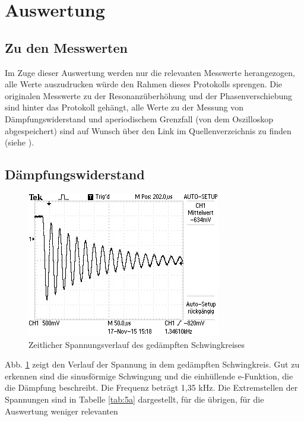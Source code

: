 \section{Auswertung}
\label{sec:Auswertung}
\subsection{Zu den Messwerten}
Im Zuge dieser Auswertung werden nur die relevanten Messwerte herangezogen,
alle Werte auszudrucken würde den Rahmen dieses Protokolls sprengen.
Die originalen Messwerte zu der Resonanzüberhöhung und der
Phasenverschiebung sind hinter das Protokoll
gehängt, alle Werte zu der Messung von Dämpfungswiderstand
und aperiodischem Grenzfall (von dem Oszilloskop abgespeichert)
sind auf Wunsch über den Link im Quellenverzeichnis zu finden
(siehe \cite{messwerte}).
\subsection{Dämpfungswiderstand}
\begin{figure}[H]
  \centering
  \includegraphics[width=\textwidth]{data/F0000TEK.jpg}
  \caption{Zeitlicher Spannungsverlauf des gedämpften Schwingkreises}
  \label{fig:5aergebnis}
\end{figure}
Abb. \ref{fig:5aergebnis} zeigt den Verlauf der Spannung in dem gedämpften
Schwingkreis. Gut zu erkennen sind die sinusförmige Schwingung und
die einhüllende e-Funktion, die die Dämpfung beschreibt.
Die Frequenz beträgt 1,35 kHz.
Die Extremstellen der Spannungen sind in Tabelle \ref{tab:5a} dargestellt,
für die übrigen, für die Auswertung weniger relevanten
